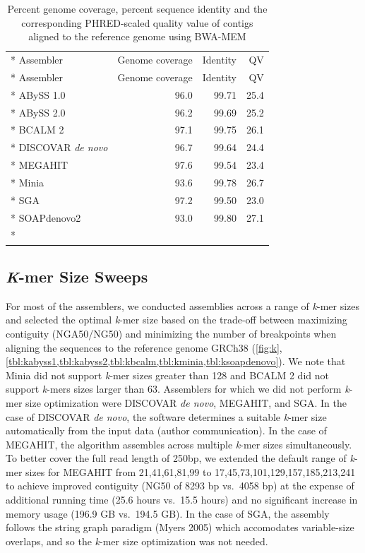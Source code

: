 \documentclass[
  12pt,
  oneside,
  openany]{book}
\begin{document}
\begin{appendices}
\hypertarget{tbl:cov}{}
\begin{singlespace}
\small
\begin{longtable}[]{@{}lrrr@{}}
\caption[Percent genome coverage, percent sequence identity and the corresponding PHRED-scaled quality value of contigs aligned to the reference genome using BWA-MEM]{\label{tbl:cov}Percent genome coverage, percent sequence identity and the corresponding PHRED-scaled quality value of contigs aligned to the reference genome using BWA-MEM}\tabularnewline*
\toprule
Assembler & Genome coverage & Identity & QV\tabularnewline*
\midrule
\endfirsthead
\toprule
Assembler & Genome coverage & Identity & QV\tabularnewline*
\midrule
\endhead
ABySS 1.0 & 96.0 & 99.71 & 25.4\tabularnewline*
ABySS 2.0 & 96.2 & 99.69 & 25.2\tabularnewline*
BCALM 2 & 97.1 & 99.75 & 26.1\tabularnewline*
DISCOVAR \emph{de novo} & 96.7 & 99.64 & 24.4\tabularnewline*
MEGAHIT & 97.6 & 99.54 & 23.4\tabularnewline*
Minia & 93.6 & 99.78 & 26.7\tabularnewline*
SGA & 97.2 & 99.50 & 23.0\tabularnewline*
SOAPdenovo2 & 93.0 & 99.80 & 27.1\tabularnewline*
\bottomrule
\end{longtable}
\end{singlespace}

\hypertarget{k-mer-size-sweeps}{%
\subsection{\texorpdfstring{\emph{K}-mer Size Sweeps}{K-mer Size Sweeps}}\label{k-mer-size-sweeps}}

For most of the assemblers, we conducted assemblies across a range of \emph{k}-mer sizes and selected the optimal \emph{k}-mer size based on the trade-off between maximizing contiguity (NGA50/NG50) and minimizing the number of breakpoints when aligning the sequences to the reference genome GRCh38 (\cref{fig:k}, \cref{tbl:kabyss1,tbl:kabyss2,tbl:kbcalm,tbl:kminia,tbl:ksoapdenovo}). We note that Minia did not support \emph{k}-mer sizes greater than 128 and BCALM 2 did not support \emph{k}-mers sizes larger than 63. Assemblers for which we did not perform \emph{k}-mer size optimization were DISCOVAR \emph{de novo}, MEGAHIT, and SGA. In the case of DISCOVAR \emph{de novo}, the software determines a suitable \emph{k}-mer size automatically from the input data (author communication). In the case of MEGAHIT, the algorithm assembles across multiple \emph{k}-mer sizes simultaneously. To better cover the full read length of 250bp, we extended the default range of \emph{k}-mer sizes for MEGAHIT from 21,41,61,81,99 to 17,45,73,101,129,157,185,213,241 to achieve improved contiguity (NG50 of 8293 bp vs.~4058 bp) at the expense of additional running time (25.6 hours vs.~15.5 hours) and no significant increase in memory usage (196.9 GB vs.~194.5 GB). In the case of SGA, the assembly follows the string graph paradigm (Myers 2005) which accomodates variable-size overlaps, and so the \emph{k}-mer size optimization was not needed.


\end{appendices}
\end{document}
